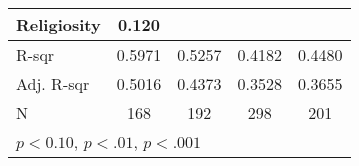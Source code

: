 {\begin{tabular}{l*{4}{c}}
    \addlinespace
    Religiosity         & 0.120\sym{*}   &                &                &                       \\
    \midrule
    R-sqr               & 0.5971         & 0.5257         & 0.4182         & 0.4480                \\
    Adj. R-sqr          & 0.5016         & 0.4373         & 0.3528         & 0.3655                \\
    N                   & 168            & 192            & 298            & 201                   \\
    \bottomrule
    \multicolumn{4}{l}{\footnotesize \sym{*} \(p<0.10\), \sym{**} \(p<.01\), \sym{***} \(p<.001\)} \\
\end{tabular}
}
